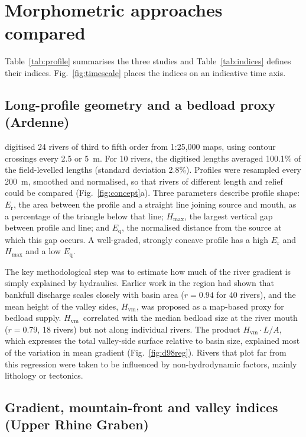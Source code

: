 \documentclass[10pt,a4paper,twocolumn]{article}
\newcommand{\Hvm}{\ensuremath{H_\mathrm{vm}}}
\begin{document}
\section{Morphometric approaches compared}

Table~\ref{tab:profile} summarises the three studies and Table~\ref{tab:indices} defines their
indices. Fig.~\ref{fig:timescale} places the indices on an indicative time axis.

\subsection{Long-profile geometry and a bedload proxy (Ardenne)}

\citet{Demoulin1998} digitised 24 rivers of third to fifth order from 1:25,000 maps, using contour
crossings every 2.5 or 5~m. For 10 rivers, the digitised lengths averaged 100.1\% of the field-levelled lengths (standard
deviation 2.8\%). Profiles were resampled every 200~m, smoothed and normalised, so that rivers of
different length and relief could be compared (Fig.~\ref{fig:concept}a). Three parameters describe
profile shape: $E_\mathrm{r}$, the area between the profile and a straight line joining source and
mouth, as a percentage of the triangle below that line; $H_\mathrm{max}$, the largest vertical gap
between profile and line; and $E_\mathrm{q}$, the normalised distance from the source at which this
gap occurs. A well-graded, strongly concave profile has a high $E_\mathrm{r}$ and $H_\mathrm{max}$
and a low $E_\mathrm{q}$.

The key methodological step was to estimate how much of the river gradient is simply explained by
hydraulics. Earlier work in the region had shown that bankfull discharge scales closely with basin area
($r=0.94$ for 40 rivers),
and the mean height of the valley sides, \Hvm, was proposed as a map-based proxy for bedload supply.
\Hvm\ correlated with the median bedload size at the river mouth ($r=0.79$, 18 rivers) but not along
individual rivers. The product $\Hvm\cdot L/A$, which expresses the total valley-side surface relative
to basin size, explained most of the variation in mean gradient (Fig.~\ref{fig:d98reg}). Rivers that
plot far from this regression were taken to be influenced by non-hydrodynamic factors, mainly
lithology or tectonics.

\subsection{Gradient, mountain-front and valley indices (Upper Rhine Graben)}
\end{document}
